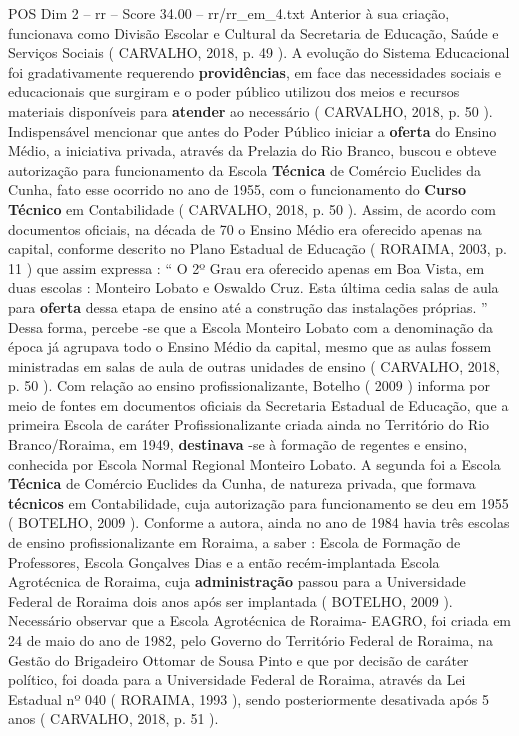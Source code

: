 \begin{textsample}{POS Dim 2 – rr – Score 34.00 – rr/rr\_em\_4.txt}
Anterior à sua criação, funcionava como Divisão Escolar e Cultural da Secretaria de Educação, Saúde e Serviços Sociais ( CARVALHO, 2018, p. 49 ).
A evolução do Sistema Educacional foi gradativamente requerendo \textbf{providências}, em face das necessidades sociais e educacionais que surgiram e o poder público utilizou dos meios e recursos materiais disponíveis para \textbf{atender} ao necessário ( CARVALHO, 2018, p. 50 ).
Indispensável mencionar que antes do Poder Público iniciar a \textbf{oferta} do Ensino Médio, a iniciativa privada, através da Prelazia do Rio Branco, buscou e obteve autorização para funcionamento da Escola \textbf{Técnica} de Comércio Euclides da Cunha, fato esse ocorrido no ano de 1955, com o funcionamento do \textbf{Curso} \textbf{Técnico} em Contabilidade ( CARVALHO, 2018, p. 50 ).
Assim, de acordo com documentos oficiais, na década de 70 o Ensino Médio era oferecido apenas na capital, conforme descrito no Plano Estadual de Educação ( RORAIMA, 2003, p. 11 ) que assim expressa : “ O 2º Grau era oferecido apenas em Boa Vista, em duas escolas : Monteiro Lobato e Oswaldo Cruz.
Esta última cedia salas de aula para \textbf{oferta} dessa etapa de ensino até a construção das instalações próprias. ” Dessa forma, percebe -se que a Escola Monteiro Lobato com a denominação da época já agrupava todo o Ensino Médio da capital, mesmo que as aulas fossem ministradas em salas de aula de outras unidades de ensino ( CARVALHO, 2018, p. 50 ).
Com relação ao ensino profissionalizante, Botelho ( 2009 ) informa por meio de fontes em documentos oficiais da Secretaria Estadual de Educação, que a primeira Escola de caráter Profissionalizante criada ainda no Território do Rio Branco/Roraima, em 1949, \textbf{destinava} -se à formação de regentes e ensino, conhecida por Escola Normal Regional Monteiro Lobato.
A segunda foi a Escola \textbf{Técnica} de Comércio Euclides da Cunha, de natureza privada, que formava \textbf{técnicos} em Contabilidade, cuja autorização para funcionamento se deu em 1955 ( BOTELHO, 2009 ).
Conforme a autora, ainda no ano de 1984 havia três escolas de ensino profissionalizante em Roraima, a saber : Escola de Formação de Professores, Escola Gonçalves Dias e a então recém-implantada Escola Agrotécnica de Roraima, cuja \textbf{administração} passou para a Universidade Federal de Roraima dois anos após ser implantada ( BOTELHO, 2009 ).
Necessário observar que a Escola Agrotécnica de Roraima- EAGRO, foi criada em 24 de maio do ano de 1982, pelo Governo do Território Federal de Roraima, na Gestão do Brigadeiro Ottomar de Sousa Pinto e que por decisão de caráter político, foi doada para a Universidade Federal de Roraima, através da Lei Estadual nº 040 ( RORAIMA, 1993 ), sendo posteriormente desativada após 5 anos ( CARVALHO, 2018, p. 51 ).

\end{textsample}
